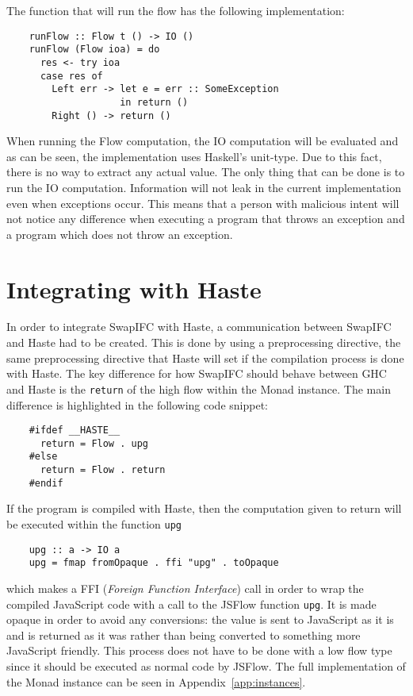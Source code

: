 The function that will run the flow has the following implementation:
\begin{verbatim}
    runFlow :: Flow t () -> IO ()
    runFlow (Flow ioa) = do
      res <- try ioa
      case res of
        Left err -> let e = err :: SomeException
                    in return ()
        Right () -> return ()
\end{verbatim}
When running the Flow computation, the IO computation will be evaluated and as can be seen, the implementation uses Haskell's unit-type. Due to this fact, there is no way to extract any actual value. The only thing that can be done is to run the IO computation. Information will not leak in the current implementation even when exceptions occur. This means that a person with malicious intent will not notice any difference when executing a program that throws an exception and a program which does not throw an exception.

\section{Integrating with Haste}
\label{chapter:incorporating-with-haste}
In order to integrate SwapIFC with Haste, a communication between SwapIFC and Haste had to be created. This is done by using a preprocessing directive, the same preprocessing directive that Haste will set if the compilation process is done with Haste. The key difference for how SwapIFC should behave between GHC and Haste is the {\tt return} of the high flow within the Monad instance. The main difference is highlighted in the following code snippet:
\begin{verbatim}
    #ifdef __HASTE__
      return = Flow . upg
    #else
      return = Flow . return
    #endif
\end{verbatim}
If the program is compiled with Haste, then the computation given to return will be executed within the function {\tt upg}
\begin{verbatim}
    upg :: a -> IO a
    upg = fmap fromOpaque . ffi "upg" . toOpaque
\end{verbatim}
which makes a FFI (\emph{Foreign Function Interface}) call in order to wrap the compiled JavaScript code with a call to the JSFlow function {\tt upg}. It is made opaque in order to avoid any conversions: the value is sent to JavaScript as it is and is returned as it was rather than being converted to something more JavaScript friendly. This process does not have to be done with a low flow type since it should be executed as normal code by JSFlow. The full implementation of the Monad instance can be seen in Appendix~\ref{app:instances}.

